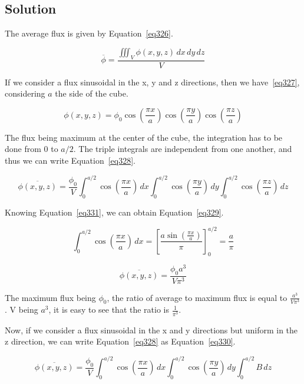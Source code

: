 \subsection{Solution}

The average flux is given by Equation~\ref{eq326}.

\begin{equation}\label{eq326}
\overline{\phi} = \frac{\iiint_V \phi(x,y,z) \,dx\,dy\,dz}{V}
\end{equation}

If we consider a flux sinusoidal in the x, y and z directions, then we have~\ref{eq327}, considering $a$ the side of the cube.

\begin{equation}\label{eq327}
\phi(x,y,z) = \phi_0\cos(\frac{\pi x}{a})\cos(\frac{\pi y}{a})\cos(\frac{\pi z}{a})
\end{equation}

The flux being maximum at the center of the cube, the integration has to be done from 0 to $a/2$. The triple integrals are independent from one another, and thus we can write Equation~\ref{eq328}.

\begin{equation}\label{eq328}
\overline{\phi(x,y,z)} = \frac{\phi_0}{V} \int_0^{a/2} \cos(\frac{\pi x}{a}) \,dx \int_0^{a/2} \cos(\frac{\pi y}{a}) \,dy \int_0^{a/2} \cos(\frac{\pi z}{a}) \,dz 
\end{equation}


Knowing Equation~\ref{eq331}, we can obtain Equation~\ref{eq329}.

\begin{equation}\label{eq331}
\int_0^{a/2} \cos(\frac{\pi x}{a}) \,dx = \left[ \frac{a \sin(\frac{\pi x}{a})}{\pi} \right]_0^{a/2} = \frac{a}{\pi}
\end{equation}

\begin{equation}\label{eq329}
\overline{\phi(x,y,z)} = \frac{\phi_0 a^3}{V\pi^3} 
\end{equation}

The maximum flux being $\phi_0$, the ratio of average to maximum flux is equal to $\frac{a^3}{V\pi^3}$. V being $a^3$, it is easy to see that the ratio is $\frac{1}{\pi^3}$.

Now, if we consider a flux sinusoidal in the x and y directions but uniform in the z direction, we can write Equation~\ref{eq328} as Equation~\ref{eq330}.


\begin{equation}\label{eq330}
\overline{\phi(x,y,z)} = \frac{\phi_0}{V} \int_0^{a/2} \cos(\frac{\pi x}{a}) \,dx \int_0^{a/2} \cos(\frac{\pi y}{a}) \,dy \int_0^{a/2} B \,dz 
\end{equation}

